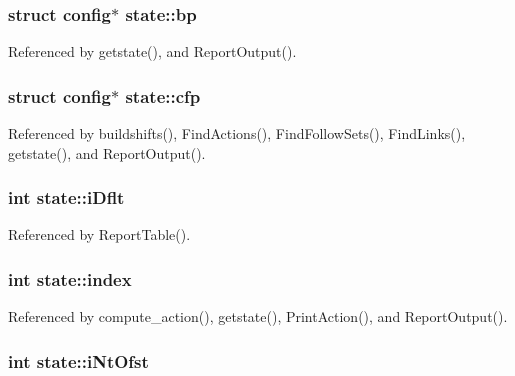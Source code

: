 \hypertarget{structstate_a09633c6d7dd89ec1bd86c5e55b51128b}{
\subsubsection[{bp}]{\setlength{\rightskip}{0pt plus 5cm}struct {\bf config}$\ast$ state\-::bp}}\label{structstate_a09633c6d7dd89ec1bd86c5e55b51128b}


Referenced by getstate(), and Report\-Output().

\hypertarget{structstate_a1e54836d6c64845338d17c076ba145f3}{
\subsubsection[{cfp}]{\setlength{\rightskip}{0pt plus 5cm}struct {\bf config}$\ast$ state\-::cfp}}\label{structstate_a1e54836d6c64845338d17c076ba145f3}


Referenced by buildshifts(), Find\-Actions(), Find\-Follow\-Sets(), Find\-Links(), getstate(), and Report\-Output().

\hypertarget{structstate_aa635d045a97d216a756a9603fd9c9c76}{
\subsubsection[{i\-Dflt}]{\setlength{\rightskip}{0pt plus 5cm}int state\-::i\-Dflt}}\label{structstate_aa635d045a97d216a756a9603fd9c9c76}


Referenced by Report\-Table().

\hypertarget{structstate_a3710ff75625cc669e86b54029bb944bb}{
\subsubsection[{index}]{\setlength{\rightskip}{0pt plus 5cm}int state\-::index}}\label{structstate_a3710ff75625cc669e86b54029bb944bb}


Referenced by compute\-\_\-action(), getstate(), Print\-Action(), and Report\-Output().

\hypertarget{structstate_a76c5eafaf09d92e514623f3f3171fba6}{
\subsubsection[{i\-Nt\-Ofst}]{\setlength{\rightskip}{0pt plus 5cm}int state\-::i\-Nt\-Ofst}}\label{structstate_a76c5eafaf09d92e514623f3f3171fba6}


